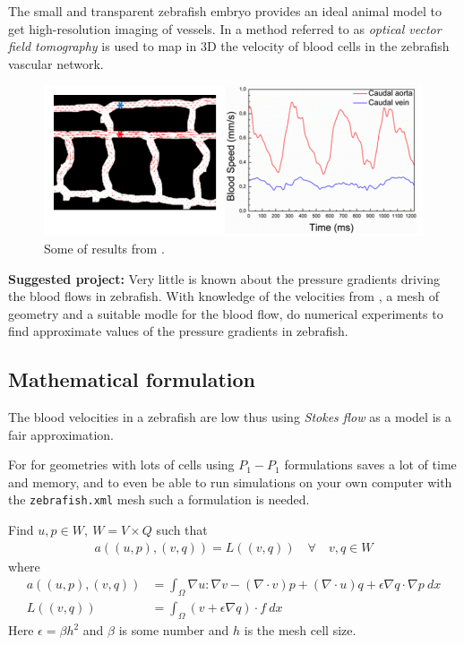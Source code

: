\documentclass[epsfig,11pt]{article}
\begin{document}
The small and transparent zebrafish embryo provides an ideal animal model to get high-resolution imaging of vessels. In \cite{fieramonti2015quantitative} a method referred to as \emph{optical vector field tomography} is used to map in 3D the velocity of blood cells in the zebrafish vascular network. 

\begin{figure}[h!] 
\begin{center}
  \includegraphics[scale=0.5]{blood_velocities.png}
  \end{center}
  \caption{Some of results from \cite{fieramonti2015quantitative}.}
\end{figure}

\textbf{Suggested project:} Very little is known about the pressure gradients driving the blood flows in zebrafish. With knowledge of the velocities from \cite{fieramonti2015quantitative}, a mesh of geometry and a suitable modle for the blood flow, do numerical experiments to find approximate values of the pressure gradients in zebrafish.

\subsection{Mathematical formulation}

The blood velocities in a zebrafish are low thus using \emph{Stokes flow} as a model is a fair approximation.

For for geometries with lots of cells using $P_1-P_1$ formulations saves a lot of time and memory, and to even be able to run simulations on your own computer with the \texttt{zebrafish.xml} mesh such a formulation is needed. 

Find $u,p \in W,\: W = V \times Q $ such that
\begin{align*}
a((u,p),(v,q)) = L((v,q)) \quad \forall \quad v,q \in W 
\end{align*}
where
\begin{align*}
a((u,p),(v,q)) &= \int_\Omega \nabla u : \nabla v - (\nabla \cdot v)p + (\nabla \cdot u)q + \epsilon \nabla q \cdot \nabla p \: dx \\
L((v,q)) &= \int_\Omega  (v + \epsilon \nabla q) \cdot f \: dx
\end{align*}
Here \(\epsilon = \beta h^2\) and \(\beta\) is some number and \(h\) is the mesh cell size.
\end{document}
